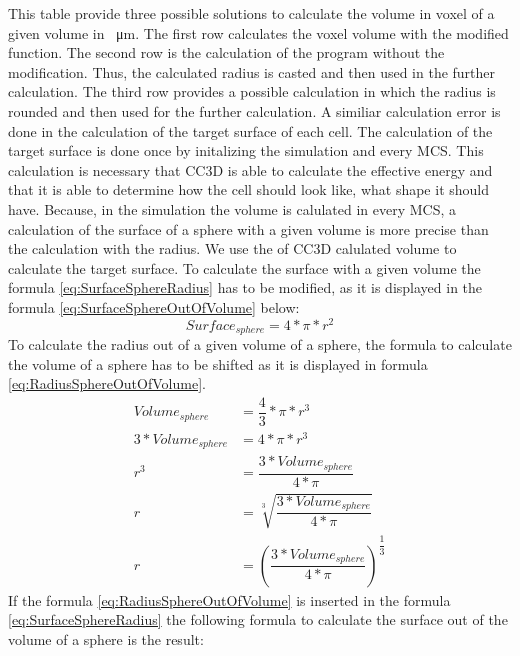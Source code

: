 This table provide three possible solutions to calculate the volume in voxel of a given volume in \SI{}{\micro\metre}. The first row calculates the voxel volume with the modified function. The second row is the calculation of the program without the modification. Thus, the calculated radius is casted and then used in the further calculation. The third row provides a possible calculation in which the radius is rounded and then used for the further calculation. \newline
A similiar calculation error is done in the calculation of the target surface of each cell. The calculation of the target surface is done once by initalizing the simulation and every \ac{MCS}. This calculation is necessary that \ac{CC3D} is able to calculate the effective energy and that it is able to determine how the cell should look like, what shape it should have. \newline
Because, in the simulation the volume is calulated in every \ac{MCS}, a calculation of the surface of a sphere with a given volume is more precise than the calculation with the radius. We use the of \ac{CC3D} calulated volume to calculate the target surface. To calculate the surface with a given volume the formula \ref{eq:SurfaceSphereRadius} has to be modified, as it is displayed in the formula \ref{eq:SurfaceSphereOutOfVolume} below:
\begin{equation}\label{eq:SurfaceSphereRadius}
Surface_{sphere} = 4*\pi*r^{2}				 
\end{equation}
To calculate the radius out of a given volume of a sphere, the formula to calculate the volume of a sphere has to be shifted as it is displayed in formula \ref{eq:RadiusSphereOutOfVolume}.
\begin{equation}\label{eq:RadiusSphereOutOfVolume}
\begin{split}
Volume_{sphere} 	&= \dfrac{4}{3} * \pi * r^{3} \\
3 * Volume_{sphere} &= 4 * \pi * r^{3} \\
r^{3}				 &= \dfrac{3*Volume_{sphere}}{4*\pi} \\
r					 &=\sqrt[3]{\dfrac{3*Volume_{sphere}}{4*\pi}} \\
r					&= (\dfrac{3*Volume_{sphere}}{4*\pi})^{\dfrac{1}{3}}
\end{split}
\end{equation}
If the formula \ref{eq:RadiusSphereOutOfVolume} is inserted in the formula \ref{eq:SurfaceSphereRadius} the following formula to calculate the surface out of the volume of a sphere is the result:
